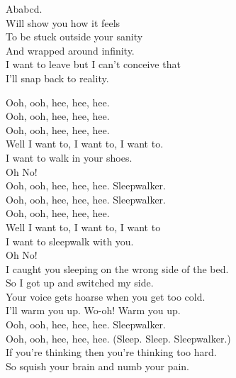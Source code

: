 


Ababcd. \\
Will show you how it feels \\
To be stuck outside your sanity \\
And wrapped around infinity. \\
I want to leave but I can't conceive that \\
I'll snap back to reality. \\





Ooh, ooh, hee, hee, hee. \\
Ooh, ooh, hee, hee, hee. \\
Ooh, ooh, hee, hee, hee. \\
Well I want to, I want to, I want to. \\
I want to walk in your shoes. \\
Oh No! \\

Ooh, ooh, hee, hee, hee. Sleepwalker. \\
Ooh, ooh, hee, hee, hee. Sleepwalker. \\
Ooh, ooh, hee, hee, hee. \\
Well I want to, I want to, I want to \\
I want to sleepwalk with you. \\
Oh No! \\

I caught you sleeping on the wrong side of the bed. \\
So I got up and switched my side. \\
Your voice gets hoarse when you get too cold. \\
I'll warm you up. Wo-oh! Warm you up. \\
Ooh, ooh, hee, hee, hee. Sleepwalker. \\
Ooh, ooh, hee, hee, hee. (Sleep. Sleep. Sleepwalker.) \\

If you're thinking then you're thinking too hard. \\
So squish your brain and numb your pain. \\

